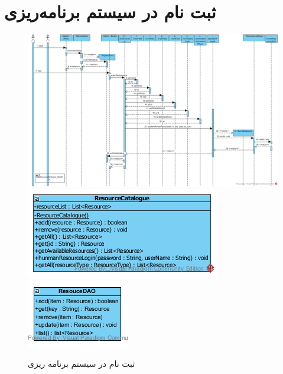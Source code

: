 \section{ثبت نام در سیستم برنامه‌ریزی}
\begin{figure}[H]
	\centering
	\includegraphics[scale=0.65]{img/sequence-design/SignUp}
	\includegraphics[scale=0.7]{img/sequence-design/SignUpC}
	\includegraphics[scale=0.7]{img/sequence-design/SignUpD}
	\caption{ثبت نام در سیستم برنامه ریزی}
\end{figure}

